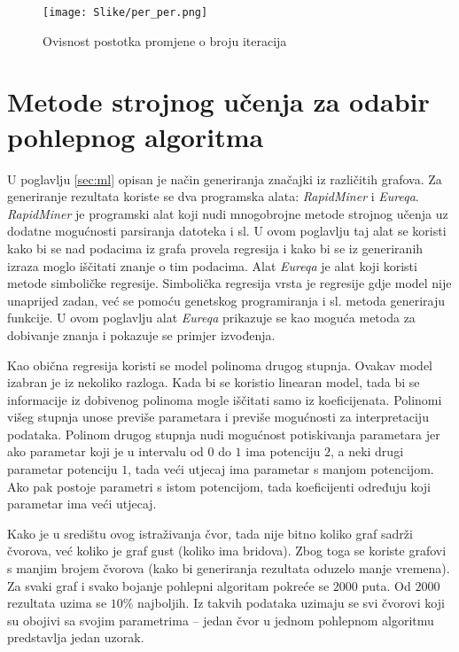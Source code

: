 \documentclass[times, utf8, diplomski, numeric]{fer}
\begin{document}
\begin{figure}[htb]
	\texttt{[image: Slike/per\_per.png]}
	\caption{Ovisnost postotka promjene o broju iteracija}
	\label{fig:per_per}
\end{figure}

\section{Metode strojnog učenja za odabir pohlepnog algoritma}

U poglavlju \ref{sec:ml} opisan je način generiranja značajki iz različitih grafova. Za generiranje rezultata koriste se dva programska alata: \emph{RapidMiner} i \emph{Eureqa}. \emph{RapidMiner} je programski alat koji nudi mnogobrojne metode strojnog učenja uz dodatne mogućnosti parsiranja datoteka i sl. U ovom poglavlju taj alat se koristi kako bi se nad podacima iz grafa provela regresija i kako bi se iz generiranih izraza moglo iščitati znanje o tim podacima. Alat \emph{Eureqa} je alat koji koristi metode simboličke regresije. Simbolička regresija vrsta je regresije gdje model nije unaprijed zadan, već se pomoću genetskog programiranja i sl. metoda generiraju funkcije. U ovom poglavlju alat \emph{Eureqa} prikazuje se kao moguća metoda za dobivanje znanja i pokazuje se primjer izvođenja.

Kao obična regresija koristi se model polinoma drugog stupnja. Ovakav model izabran je iz nekoliko razloga. Kada bi se koristio linearan model, tada bi se informacije iz dobivenog polinoma mogle iščitati samo iz koeficijenata. Polinomi višeg stupnja unose previše parametara i previše mogućnosti za interpretaciju podataka. Polinom drugog stupnja nudi mogućnost potiskivanja parametara jer ako parametar koji je u intervalu od $0$ do $1$ ima potenciju $2$, a neki drugi parametar potenciju $1$, tada veći utjecaj ima parametar s manjom potencijom. Ako pak postoje parametri s istom potencijom, tada koeficijenti određuju koji parametar ima veći utjecaj.

Kako je u središtu ovog istraživanja čvor, tada nije bitno koliko graf sadrži čvorova, već koliko je graf gust (koliko ima bridova). Zbog toga se koriste grafovi s manjim brojem čvorova (kako bi generiranja rezultata oduzelo manje vremena). Za svaki graf i svako bojanje pohlepni algoritam pokreće se $2000$ puta. Od $2000$ rezultata uzima se $10\%$ najboljih. Iz takvih podataka uzimaju se svi čvorovi koji su obojivi sa svojim parametrima -- jedan čvor u jednom pohlepnom algoritmu predstavlja jedan uzorak.
\end{document}
